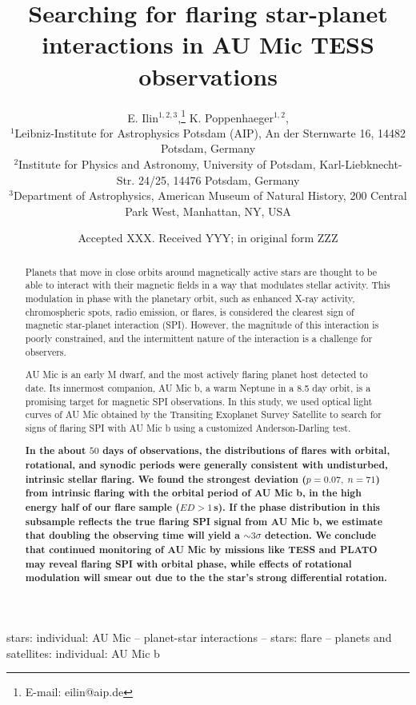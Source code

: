 \documentclass[fleqn,usenatbib]{mnras}%
\title[Flaring SPI in AU Mic]{Searching for flaring star-planet interactions in AU Mic TESS observations}
\author[E. Ilin et al.]{
E. Ilin$^{1,2,3}$,\thanks{E-mail: eilin@aip.de}
K. Poppenhaeger$^{1,2}$,
\\
$^{1}$Leibniz-Institute for Astrophysics Potsdam (AIP), An der Sternwarte 16, 14482 Potsdam, Germany\\
$^{2}$Institute for Physics and Astronomy, University of Potsdam, Karl-Liebknecht-Str. 24/25, 14476 Potsdam, Germany\\
$^{3}$Department of Astrophysics, American Museum of Natural History, 200 Central Park West, Manhattan, NY, USA\\
}
\date{Accepted XXX. Received YYY; in original form ZZZ}
\begin{document}
\label{firstpage}
\pagerange{\pageref{firstpage}--\pageref{lastpage}}
\maketitle

\begin{abstract}
Planets that move in close orbits around magnetically active stars are thought to be able to interact with their magnetic fields in a way that modulates stellar activity. This modulation in phase with the planetary orbit, such as enhanced X-ray activity, chromospheric spots, radio emission, or flares, is considered the clearest sign of magnetic star-planet interaction (SPI). However, the magnitude of this interaction is poorly constrained, and the intermittent nature of the interaction is a challenge for observers. 

AU Mic is an early M dwarf, and the most actively flaring planet host detected to date. Its innermost companion, AU Mic b, a warm Neptune in a 8.5 day orbit, is a promising target for magnetic SPI observations. In this study, we used optical light curves of AU Mic obtained by the Transiting Exoplanet Survey Satellite to search for signs of flaring SPI with AU Mic b using a customized Anderson-Darling test. 

\textbf{In the about $50$ days of observations, the distributions of flares with orbital, rotational, and synodic periods were generally consistent with undisturbed, intrinsic stellar flaring. We found the strongest deviation ($p=0.07,\;n=71$) from intrinsic flaring with the orbital period of AU Mic b, in the high energy half of our flare sample ($ED>1$\,s). If the phase distribution in this subsample reflects the true flaring SPI signal from AU Mic b, we estimate that doubling the observing time will yield a $\sim3\sigma$ detection. We conclude that continued monitoring of AU Mic by missions like TESS and PLATO may reveal flaring SPI with orbital phase, while effects of rotational modulation will smear out due to the the star's strong differential rotation.}
\end{abstract}

\begin{keywords}
stars: individual: AU Mic -- planet-star interactions -- stars: flare -- planets and satellites: individual: AU Mic b
\end{keywords}
\end{document}
